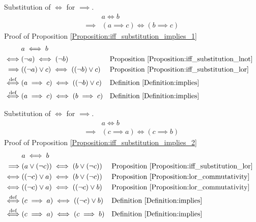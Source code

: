 \begin{prop}
\label{Proposition:iff_substitution_implies_1}
Substitution of $\iff$ for $\implies$.
\begin{align*}
& a \iff b \\
\implies & (a \implies c) \iff (b \implies c)
\end{align*}
Proof of Proposition \ref{Proposition:iff_substitution_implies_1}
\begin{align*}
& a \iff b \\
\iff & (\lnot a) \iff (\lnot b)
& & \text{Proposition \ref{Proposition:iff_substitution_lnot}} \\
\implies & ((\lnot a) \lor c) \iff ((\lnot b) \lor c)
& & \text{Proposition \ref{Proposition:iff_substitution_lor}} \\
\overset{\operatorname{def}}{\iff} & (a \implies c) \iff ((\lnot b) \lor c)
& & \text{Definition \ref{Definition:implies}} \\
\overset{\operatorname{def}}{\iff} & (a \implies c) \iff (b \implies c)
& & \text{Definition \ref{Definition:implies}} \\
\end{align*}
\end{prop}

\begin{prop}
\label{Proposition:iff_substitution_implies_2}
Substitution of $\iff$ for $\implies$.
\begin{align*}
& a \iff b \\
\implies & (c \implies a) \iff (c \implies b)
\end{align*}
Proof of Proposition \ref{Proposition:iff_substitution_implies_2}
\begin{align*}
& a \iff b \\
\implies & (a \lor (\lnot c)) \iff (b \lor (\lnot c))
& & \text{Proposition \ref{Proposition:iff_substitution_lor}} \\
\iff & ((\lnot c) \lor a) \iff (b \lor (\lnot c))
& & \text{Proposition \ref{Proposition:lor_commutativity}} \\
\iff & ((\lnot c) \lor a) \iff ((\lnot c) \lor b)
& & \text{Proposition \ref{Proposition:lor_commutativity}} \\
\overset{\operatorname{def}}{\iff} & (c \implies a) \iff ((\lnot c) \lor b)
& & \text{Definition \ref{Definition:implies}} \\
\overset{\operatorname{def}}{\iff} & (c \implies a) \iff (c \implies b)
& & \text{Definition \ref{Definition:implies}} \\
\end{align*}
\end{prop}


